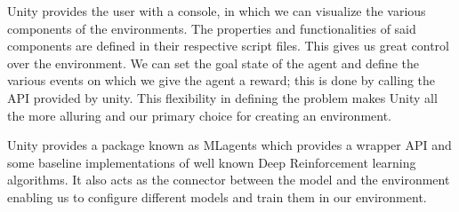 Unity provides the user with a console, in which we can
visualize the various components of the environments. The
properties and functionalities of said components are defined
in their respective script files. This gives us great control
over the environment. We can set the goal state of the agent
and define the various events on which we give the agent a
reward; this is done by calling the API provided by
unity. This flexibility in defining the problem makes Unity
all the more alluring and our primary choice for creating an
environment.

Unity provides a package known as MLagents which provides a
wrapper API and some baseline implementations of well known
Deep Reinforcement learning algorithms. It also acts as the
connector between the model and the environment enabling us
to configure different models and train them in our
environment.

